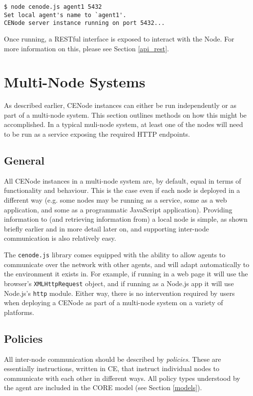 \documentclass{scrartcl}
\begin{document}
\begin{verbatim}
$ node cenode.js agent1 5432
Set local agent's name to `agent1'.
CENode server instance running on port 5432...
\end{verbatim}

Once running, a RESTful interface is exposed to interact with the Node. For more information on this, please see Section \ref{api_rest}.

\section{Multi-Node Systems}
As described earlier, CENode instances can either be run independently or as part of a multi-node system. This section outlines methods on how this might be accomplished. In a typical muli-node system, at least one of the nodes will need to be run as a service exposing the required HTTP endpoints.

\subsection{General}
All CENode instances in a multi-node system are, by default, equal in terms of functionality and behaviour. This is the case even if each node is deployed in a different way (e.g. some nodes may be running as a service, some as a web application, and some as a programmatic JavaScript application). Providing information to (and retrieving information from) a local node is simple, as shown briefly earlier and in more detail later on, and supporting inter-node communication is also relatively easy.

The \texttt{cenode.js} library comes equipped with the ability to allow agents to communicate over the network with other agents, and will adapt automatically to the environment it exists in. For example, if running in a web page it will use the browser's \texttt{XMLHttpRequest} object, and if running as a Node.js app it will use Node.js's \texttt{http} module. Either way, there is no intervention required by users when deploying a CENode as part of a multi-node system on a variety of platforms.


\subsection{Policies}
\label{policies}
All inter-node communication should be described by \textit{policies}. These are essentially instructions, written in CE, that instruct individual nodes to communicate with each other in different ways. All policy types understood by the agent are included in the CORE model (see Section \ref{models}).\\
\end{document}
